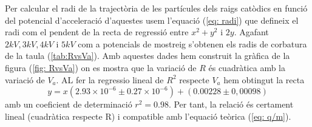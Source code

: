 \documentclass[11pt]{article}
\begin{document}
Per calcular el radi de la trajectòria de les partícules dels raigs catòdics en funció del potencial d'acceleració d'aquestes usem l'equació (\ref{eq: radi}) que defineix el radi com el pendent de la recta de regressió entre $x^2+y^2$ i $2y$. Agafant $2kV, 3kV, 4kV$ i $5kV$ com a potencials  de mostreig s'obtenen els radis de corbatura de la taula (\ref{tab:RvsVa}). Amb aquestes dades hem construit la gràfica de la figura (\ref{fig: RvsVa}) on es mostra que la variació de $R$ és cuadràtica amb la variació de $V_a$. AL fer la regressio lineal de $R^2$ respecte $V_a$ hem obtingut la recta
\begin{equation}
    y=x(2.93\times10^{-6}\pm0.27\times10^{-6})+(0.00228\pm0,00098)
\end{equation}  
amb un coeficient de determinació $r^2=0.98$. Per tant, la relació és certament lineal (cuadràtica respecte R) i compatible amb l'equació teòrica (\ref{eq: q/m}).
\end{document}
